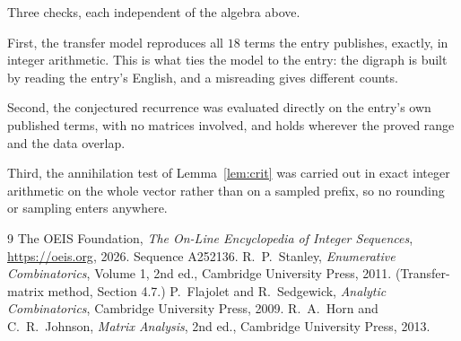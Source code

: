 \documentclass[11pt,a4paper]{article}
\theoremstyle{plain}
\theoremstyle{definition}
\begin{document}
Three checks, each independent of the algebra above.

First, the transfer model reproduces all $18$ terms the entry publishes, exactly, in
integer arithmetic. This is what ties the model to the entry: the digraph is built by reading
the entry's English, and a misreading gives different counts.

Second, the conjectured recurrence was evaluated directly on the entry's own published terms,
with no matrices involved, and holds wherever the proved range and the data overlap.

Third, the annihilation test of Lemma~\ref{lem:crit} was carried out in exact integer
arithmetic on the whole vector rather than on a sampled prefix, so no rounding or sampling
enters anywhere.

\begin{thebibliography}{9}
 The OEIS Foundation, \emph{The On-Line Encyclopedia of Integer
Sequences}, \url{https://oeis.org}, 2026. Sequence A252136.
 R.~P.~Stanley, \emph{Enumerative Combinatorics}, Volume 1, 2nd ed.,
Cambridge University Press, 2011. (Transfer-matrix method, Section 4.7.)
 P.~Flajolet and R.~Sedgewick, \emph{Analytic Combinatorics}, Cambridge
University Press, 2009.
 R.~A.~Horn and C.~R.~Johnson, \emph{Matrix Analysis}, 2nd ed., Cambridge
University Press, 2013.
\end{thebibliography}
\end{document}
